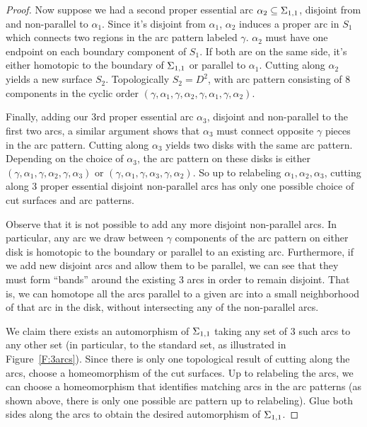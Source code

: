 \begin{proof}
Now suppose we had a second proper essential arc $\alpha_2 \subseteq \Sigma_{1,1}$,
disjoint from and non-parallel to $\alpha_1$. Since it's disjoint from
$\alpha_1$, $\alpha_2$ induces a proper arc in $S_1$ which connects two regions
in the arc pattern labeled $\gamma$.  $\alpha_2$ must have one endpoint on each
boundary component of $S_1$. If both are on the same side, it's either
homotopic to the boundary of $\Sigma_{1,1}$ or parallel to $\alpha_1$. Cutting
along $\alpha_2$ yields a new surface $S_2$. Topologically $S_2=D^2$, with arc
pattern consisting of 8 components in the cyclic order
$(\gamma,\alpha_1,\gamma,\alpha_2,\gamma,\alpha_1,\gamma,\alpha_2)$.

Finally, adding our 3rd proper essential arc $\alpha_3$, disjoint and
non-parallel to the first two arcs, a similar argument shows that $\alpha_3$
must connect opposite $\gamma$ pieces in the arc pattern. Cutting along
$\alpha_3$ yields two disks with the same arc pattern. Depending on the choice
of $\alpha_3$, the arc pattern on these disks is either
$(\gamma,\alpha_1,\gamma,\alpha_2,\gamma,\alpha_3)$ or
$(\gamma,\alpha_1,\gamma,\alpha_3,\gamma,\alpha_2)$. So up to relabeling
$\alpha_1,\alpha_2,\alpha_3$, cutting along 3 proper essential disjoint
non-parallel arcs has only one possible choice of cut surfaces and arc
patterns.

Observe that it is not possible to add any more disjoint non-parallel arcs. In
particular, any arc we draw between $\gamma$ components of the arc pattern on
either disk is homotopic to the boundary or parallel to an existing arc.
Furthermore, if we add new disjoint arcs and allow them to be parallel, we can
see that they must form ``bands'' around the existing 3 arcs in order to remain
disjoint. That is, we can homotope all the arcs parallel to a given arc into
a small neighborhood of that arc in the disk, without intersecting any of the
non-parallel arcs.

We claim there exists an automorphism of $\Sigma_{1,1}$ taking any set of 3 such
arcs to any other set (in particular, to the standard set, as illustrated in
Figure~\ref{F:3arcs}).  Since there is only one topological result of cutting
along the arcs, choose a homeomorphism of the cut surfaces. Up to relabeling
the arcs, we can choose a homeomorphism that identifies matching arcs in the
arc patterns (as shown above, there is only one possible arc pattern up to
relabeling). Glue both sides along the arcs to obtain the desired automorphism
of $\Sigma_{1,1}$.

\end{proof}

